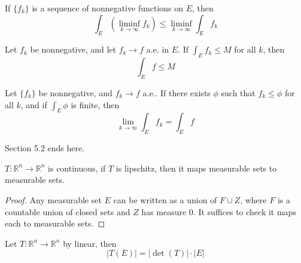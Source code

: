 \documentclass[openany]{book}
\newcommand{\R}{\mathbb{R}}
\begin{document}
\begin{thm}
    If $\{f_k\}$ is a sequence of nonnegative functions on $E$, then 
    \begin{equation*}
        \int_E(\liminf_{k\to\infty}f_k)\leq\liminf_{k\to\infty}\int_Ef_k
    \end{equation*}
\end{thm}
\begin{prop}
    Let $f_k$ be nonnegative, and let $f_k\to f$ a.e. in $E$. If $\int_Ef_k\leq M$ for all $k$, then 
    \begin{equation*}
        \int_E f\leq M
    \end{equation*}
\end{prop}
\begin{thm}
    Let $\{f_k\}$ be nonnegative, and $f_k\to f$ a.e.. If there exists $\phi$ such that $f_k\leq\phi$ for all $k$, and if $\int_E\phi$ is finite, then 
    \begin{equation*}
        \lim_{k\to\infty}\int_Ef_k=\int_Ef
    \end{equation*}
\end{thm}

Section 5.2 ends here.


\newpage


\begin{thm}[3.23]
    
\end{thm}

\begin{thm}[3.26]
    
\end{thm}


\begin{thm}[3.23]
    $T:\R^n\to\R^n$ is continuous, if $T$ is lipschitz, then it maps measurable sets to measurable sets.
\end{thm}
\begin{proof}
    Any measurable set $E$ can be written as a union of $F\cup Z$, where $F$ is a countable union of closed sets and $Z$ has measure $0$. It suffices to check it maps each to measurable sets.
\end{proof}


\begin{thm}[3.35]
    Let $T:\R^n\to\R^n$ by linear, then 
    \begin{equation*}
        |T(E)|=|\det(T)|\cdot|E|
    \end{equation*}
\end{thm}
\end{document}
